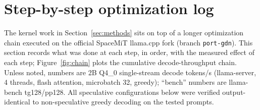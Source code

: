 \documentclass[10pt,twocolumn]{article}
\begin{document}
\section{Step-by-step optimization log}
The kernel work in Section~\ref{sec:methods} sits on top of a longer optimization chain executed on the official SpaceMiT llama.cpp fork (branch \texttt{port-gdn}). This section records what was done at each step, in order, with the measured effect of each step; Figure~\ref{fig:chain} plots the cumulative decode-throughput chain. Unless noted, numbers are 2B Q4\_0 single-stream decode tokens/s (llama-server, 4 threads, flash attention, microbatch 32, greedy); ``bench'' numbers are llama-bench tg128/pp128. All speculative configurations below were verified output-identical to non-speculative greedy decoding on the tested prompts.
\end{document}

